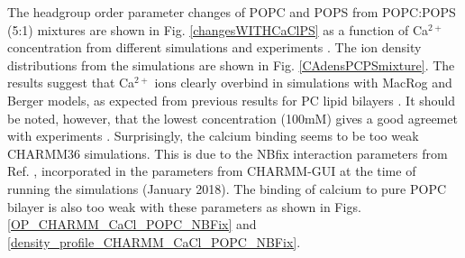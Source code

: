 \documentclass[aps,prl,superscriptaddress,twocolumn]{revtex4}
\begin{document}



The headgroup order parameter changes of POPC and POPS from POPC:POPS (5:1) mixtures
are shown in Fig. \ref{changesWITHCaClPS} as a function of Ca$^{2+}$ concentration from different
simulations and experiments \cite{roux90}. 
The ion density distributions from the simulations are shown in Fig. \ref{CAdensPCPSmixture}.
The results suggest that Ca$^{2+}$ ions clearly overbind in simulations with
MacRog and Berger models, as expected from previous results for PC lipid bilayers \cite{catte16}.
It should be noted, however, that the lowest concentration (100mM) gives
a good agreemet with experiments
.
Surprisingly, the calcium binding seems to be too weak CHARMM36 simulations.
This is due to the NBfix interaction parameters from Ref. , incorporated
in the parameters from CHARMM-GUI at the time of running the simulations (January 2018).
The binding of calcium to pure POPC bilayer is also too weak with these parameters
as shown in Figs. \ref{OP_CHARMM_CaCl_POPC_NBFix} and \ref{density_profile_CHARMM_CaCl_POPC_NBFix}.
\end{document}
